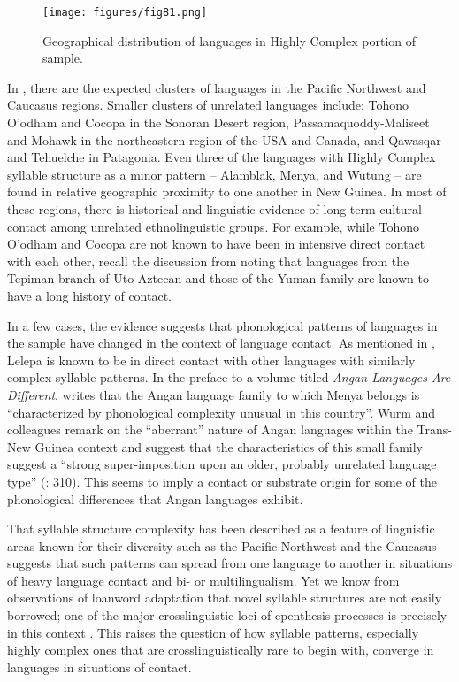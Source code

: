   
\begin{figure}
\texttt{[image: figures/fig81.png]}
\caption{\label{fig:8.1}Geographical distribution of languages in Highly Complex portion of sample.}
\end{figure}

  In , there are the expected clusters of languages in the Pacific Northwest and Caucasus regions. Smaller clusters of unrelated languages include: Tohono O’odham and Cocopa in the Sonoran Desert region, Passamaquoddy-Maliseet and Mohawk in the northeastern region of the USA and Canada, and Qawasqar and Tehuelche in Patagonia. Even three of the languages with Highly Complex syllable structure as a minor pattern -- Alamblak, Menya, and Wutung -- are found in relative geographic proximity to one another in New Guinea. In most of these regions, there is historical and linguistic evidence of long-term cultural contact among unrelated ethnolinguistic groups. For example, while Tohono O’odham and Cocopa are not known to have been in intensive direct contact with each other, recall the discussion from  noting that languages from the Tepiman branch of Uto-Aztecan and those of the Yuman family are known to have a long history of contact. 

  In a few cases, the evidence suggests that phonological patterns of languages in the sample have changed in the context of language contact. As mentioned in , Lelepa is known to be in direct contact with other languages with similarly complex syllable patterns. In the preface to a volume titled \textit{Angan Languages Are Different}, \citet[4]{Healey1981} writes that the Angan language family to which Menya belongs is “characterized by phonological complexity unusual in this country”. Wurm and colleagues remark on the “aberrant” nature of Angan languages within the Trans-New Guinea context and suggest that the characteristics of this small family suggest a “strong super-imposition upon an older, probably unrelated language type” (\citeyear{WurmEtAl1977}: 310). This seems to imply a contact or substrate origin for some of the phonological differences that Angan languages exhibit.

  That syllable structure complexity has been described as a feature of linguistic areas known for their diversity such as the Pacific Northwest and the Caucasus suggests that such patterns can spread from one language to another in situations of heavy language contact and bi- or multilingualism. Yet we know from observations of loanword adaptation that novel syllable structures are not easily borrowed; one of the major crosslinguistic loci of epenthesis processes is precisely in this context \citep{Hall2011}. This raises the question of how syllable patterns, especially highly complex ones that are crosslinguistically rare to begin with, converge in languages in situations of contact.

